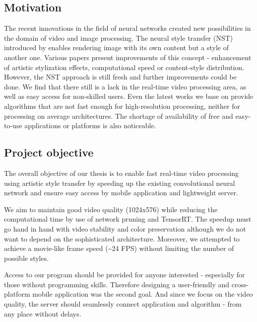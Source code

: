 \documentclass[../Main.tex]{subfiles}
\begin{document}
\subsection{Motivation}
The recent innovations in the field of neural networks created new possibilities in the domain of video and image processing. The neural style transfer (NST) introduced by \cite{gatys2015neural} enables rendering image with its own content but a style of another one. Various papers present improvements of this concept - enhancement of artistic stylization effects, computational speed or content-style distribution. However, the NST approach is still fresh and further improvements could be done. We find that there still is a lack in the real-time video processing area, as well as easy access for non-skilled users. Even the latest works we base on provide algorithms that are not fast enough for high-resolution processing, neither for processing on average architectures. The shortage of availability of free and easy-to-use applications or platforms is also noticeable.


\subsection{Project objective}
The overall objective of our thesis is to enable fast real-time video processing using artistic style transfer by speeding up the existing convolutional neural network and ensure easy access by mobile application and lightweight server.

We aim to maintain good video quality (1024x576) while reducing the computational time by use of network pruning and TensorRT. The speedup must go hand in hand with video stability and color preservation although we do not want to depend on the sophisticated architecture. Moreover, we attempted to achieve a movie-like frame speed (\textasciitilde24 FPS) without limiting the number of possible styles.

Access to our program should be provided for anyone interested - especially for those without programming skills. Therefore designing a user-friendly and cross-platform mobile application was the second goal. And since we focus on the video quality, the server should seamlessly connect application and algorithm - from any place without delays.

\newpage
\end{document}

